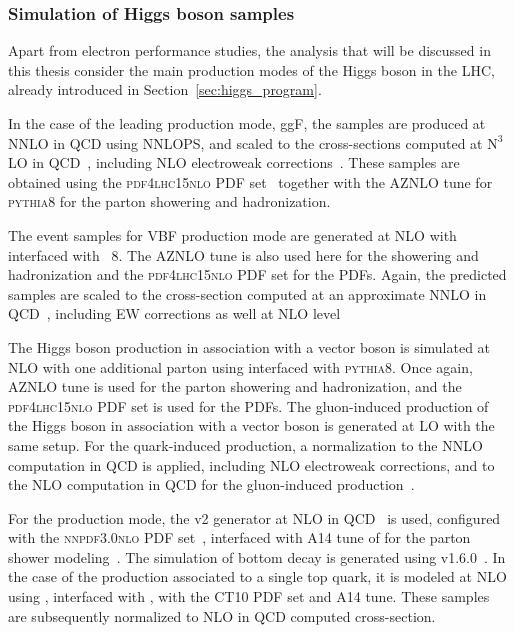 \subsubsection*{Simulation of Higgs boson samples}
Apart from electron performance studies, the analysis that will be discussed in this thesis consider the main production modes of the Higgs boson in the LHC, already introduced in Section~\ref{sec:higgs_program}. 

In the case of the leading production mode, ggF, the samples are produced at NNLO in QCD using \powheg NNLOPS, and scaled to the cross-sections computed at $\text{N}^{3}$LO in QCD~\cite{PhysRevLett.114.212001,anastasiou2016,Harlander_2009,Harlander,Harlander_2010,Pak_2010}, including NLO electroweak corrections~\cite{Actis_2008,Bonetti_2018}.
These samples are obtained using the \textsc{pdf4lhc15nlo} PDF set~\cite{Butterworth_2016} together with the \textsc{AZNLO} tune for \textsc{pythia8} for the parton showering and hadronization. 

The event samples for VBF production mode are generated at NLO with \powheg interfaced with \pythia~8. The \textsc{AZNLO} tune is also used here for the showering and hadronization and the \textsc{pdf4lhc15nlo} PDF set for the PDFs. Again, the predicted samples are scaled to the cross-section computed at an approximate NNLO in QCD~\cite{Bolzoni_2010}, including EW corrections as well at NLO level~\cite{Ciccolini_2008}

The Higgs boson production in association with a vector boson is simulated at  NLO with one additional parton using \powheg interfaced with \textsc{pythia8}. Once again, \textsc{AZNLO} tune is used for the parton showering and hadronization,
and the \textsc{pdf4lhc15nlo} PDF set is used for the PDFs. The gluon-induced production of the Higgs boson in association with a vector boson is generated at LO with the same setup. 
For the quark-induced production, a normalization to the NNLO computation in QCD is applied, including NLO electroweak corrections, and to the NLO computation in QCD for the gluon-induced production~\cite{Ciccolini_2003,Denner_2015,Harlander_2014,Altenkamp_2013,Brein_2012, Harlander_2018, Brein_2013}.

For the \tth production mode, the \powhegbox v2 generator at NLO in QCD~\cite{frixione2015,Zhang_2014,Dawson_2003,Beenakker_2003} is used, configured with the \textsc{nnpdf3.0nlo} PDF set~\cite{Martin_2009}, interfaced with A14 tune of  for the parton shower modeling~\cite{A14}. The simulation of bottom decay is generated using \evtgen v1.6.0~\cite{LANGE2001152}.
In the case of the production associated to a single top quark, it is modeled at NLO using \madgraph, interfaced with , with the \textsc{CT10} PDF set and A14 tune. These samples are subsequently normalized to NLO in QCD computed cross-section.

